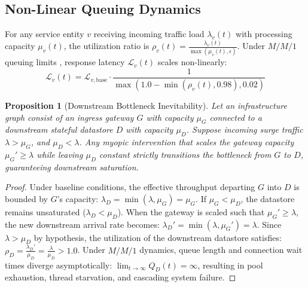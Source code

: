 \documentclass[10pt,twocolumn,letterpaper]{article}
\newtheorem{proposition}{Proposition}
\begin{document}
\subsection{Non-Linear Queuing Dynamics}
For any service entity $v$ receiving incoming traffic load $\lambda_v(t)$ with processing capacity $\mu_v(t)$, the utilization ratio is $\rho_v(t) = \frac{\lambda_v(t)}{\max(\mu_v(t), \epsilon)}$. Under $M/M/1$ queuing limits \cite{kleinrock1975queueing}, response latency $\mathcal{L}_v(t)$ scales non-linearly:
\begin{equation}
\mathcal{L}_v(t) = \mathcal{L}_{v, \text{base}} \cdot \frac{1}{\max(1.0 - \min(\rho_v(t), 0.98), 0.02)}
\end{equation}

\begin{proposition}[Downstream Bottleneck Inevitability]
Let an infrastructure graph consist of an ingress gateway $G$ with capacity $\mu_G$ connected to a downstream stateful datastore $D$ with capacity $\mu_D$. Suppose incoming surge traffic $\lambda > \mu_G$, and $\mu_D < \lambda$. Any myopic intervention that scales the gateway capacity $\mu_G' \ge \lambda$ while leaving $\mu_D$ constant strictly transitions the bottleneck from $G$ to $D$, guaranteeing downstream saturation.
\end{proposition}

\begin{proof}
Under baseline conditions, the effective throughput departing $G$ into $D$ is bounded by $G$'s capacity:
$\lambda_D = \min(\lambda, \mu_G) = \mu_G$. If $\mu_G < \mu_D$, the datastore remains unsaturated ($\lambda_D < \mu_D$).  
When the gateway is scaled such that $\mu_G' \ge \lambda$, the new downstream arrival rate becomes:
$\lambda_D' = \min(\lambda, \mu_G') = \lambda$.
Since $\lambda > \mu_D$ by hypothesis, the utilization of the downstream datastore satisfies:
$\rho_D = \frac{\lambda_D'}{\mu_D} = \frac{\lambda}{\mu_D} > 1.0$.
Under $M/M/1$ dynamics, queue length and connection wait times diverge asymptotically:
$\lim_{t \to \infty} Q_D(t) = \infty$,
resulting in pool exhaustion, thread starvation, and cascading system failure.
\end{proof}
\end{document}

